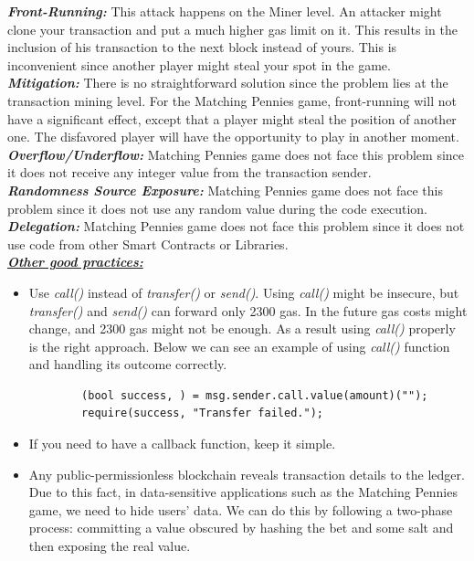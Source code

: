 \documentclass[12pt,a4paper]{article}
\begin{document}
\textbf{\emph{Front-Running: }}This attack happens on the Miner level. An attacker might clone your transaction
and put a much higher gas limit on it. This results in the inclusion of his transaction to the
next block instead of yours. This is inconvenient since another player might steal your spot in the game. \\

\textbf{\emph{Mitigation: }}There is no straightforward solution since the problem lies at the transaction mining level.
For the Matching Pennies game, front-running will not have a significant effect, except that a player
might steal the position of another one. The disfavored player will have the opportunity to play in another moment. \\

\textbf{\emph{Overflow/Underflow: }}Matching Pennies game does not face this problem since it does not receive any integer
value from the transaction sender. \\

\textbf{\emph{Randomness Source Exposure: }}Matching Pennies game does not face this problem since it does not use any
random value during the code execution. \\

\textbf{\emph{Delegation: }}Matching Pennies game does not face this problem since it does not use code
from other Smart Contracts or Libraries. \\

\textbf{\emph{\underline{Other good practices:}}} \\ 

\begin{itemize}
    \item Use \emph{call()} instead of \emph{transfer()} or \emph{send()}.
    Using \emph{call()}  might be insecure, but \emph{transfer()} and \emph{send()} can forward only 2300 gas. In the future 
    gas costs might change, and 2300 gas might not be enough. As a result using \emph{call()} properly is the right approach.
    Below we can see an example of using \emph{call()} function and handling its outcome correctly.\\
    \begin{lstlisting}
        (bool success, ) = msg.sender.call.value(amount)(""); 
        require(success, "Transfer failed.");
    \end{lstlisting}
    \item If you need to have a callback function, keep it simple.
    \item Any public-permissionless blockchain reveals transaction details to 
    the ledger. Due to this fact, in data-sensitive applications such as the
    Matching Pennies game, we need to hide users' data. We can do this by following a
    two-phase process: committing a value obscured by hashing the bet and some salt
    and then exposing the real value.
\end{itemize}
\end{document}
